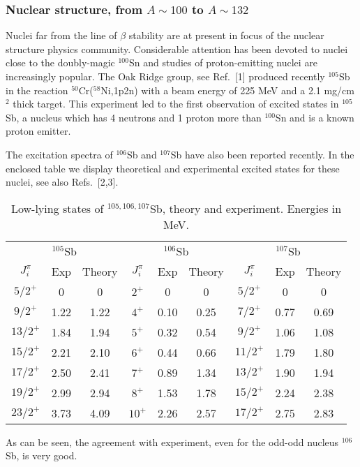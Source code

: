 \subsubsection{Nuclear structure, from $A\sim 100$ to $A\sim 132$}
Nuclei far from the line of $\beta$ stability are at present in
focus of the nuclear structure physics community. Considerable
attention has been devoted to nuclei close to the doubly-magic
$^{100}$Sn and studies of proton-emitting nuclei are increasingly
popular.
The Oak Ridge group, see Ref.~[1] produced recently 
$^{105}$Sb in the reaction $^{50}$Cr($^{58}$Ni,1p2n)
with a beam energy of 225 MeV and a 2.1 mg/cm$^2$ thick target.
This experiment led to 
the first observation of excited states in $^{105}$Sb, a nucleus which has
4 neutrons and 1 proton more than $^{100}$Sn and is a known 
proton emitter. 

The excitation spectra of $^{106}$Sb and $^{107}$Sb
have also been reported recently. 
In the enclosed table we display theoretical and 
experimental excited states for these nuclei, see also 
Refs.~[2,3].
\begin{table}[hbt]
\begin{center}
\caption{ Low-lying states of $^{105,106,107}$Sb, theory and experiment.
Energies in MeV. }\footnotesize
\begin{tabular}{ccc|ccc|ccc}
\hline
\multicolumn{3}{c|}{ $^{105}$Sb} & \multicolumn{3}{c|}{ $^{106}$Sb}& \multicolumn{3}{c}{ $^{107}$Sb} \\ 
{$J^{\pi}_i$} & {Exp} & {Theory} & 
{$J^{\pi}_i$} & {Exp} & {Theory} & 
{$J^{\pi}_i$} & {Exp} & {Theory} \\
\hline 
$5/2^{+}$ & 0 & 0 & $2^{+}$ & 0 & 0 & $5/2^{+}$ & 0 & 0 \\
$9/2^{+}$ & 1.22 & 1.22 & $4^{+}$ & 0.10 & 0.25 & $7/2^{+}$ & 0.77 & 0.69 \\
$13/2^{+}$ & 1.84 & 1.94 & $5^{+}$ & 0.32 & 0.54 & $9/2^{+}$ & 1.06 & 1.08  \\
$15/2^{+}$ & 2.21 & 2.10 & $6^{+}$ & 0.44 & 0.66 & $11/2^{+}$ & 1.79 & 1.80 \\
$17/2^{+}$ & 2.50 & 2.41 & $7^{+}$ & 0.89 & 1.34 & $13/2^{+}$ & 1.90 & 1.94  \\
$19/2^{+}$ & 2.99 & 2.94 & $8^{+}$ & 1.53 & 1.78 &  $15/2^{+}$ & 2.24 & 2.38\\
$23/2^{+}$ & 3.73 & 4.09 & $10^{+}$ & 2.26 & 2.57 & $17/2^{+}$ & 2.75 & 2.83  \\\hline
\end{tabular}
\end{center}
\end{table}
As can be seen, the agreement with experiment, even for
the odd-odd nucleus $^{106}$Sb, is very good. 

